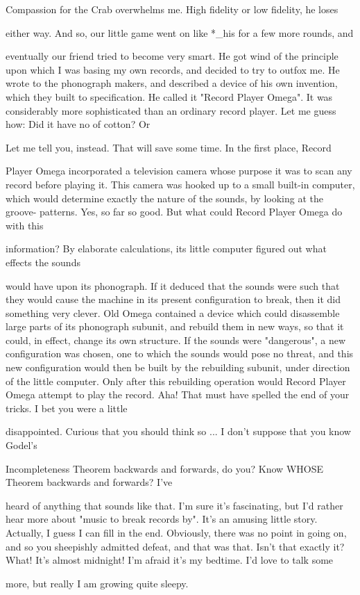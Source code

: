 \achilles Compassion for the Crab overwhelms me. High fidelity or low fidelity, he loses\par
either way. 
\tortoise And so, our little game went on like *_his for a few more rounds, and\par
eventually our friend tried to become very smart. He got wind of the principle upon which I was basing my own records, and decided to try to outfox me. He wrote to the phonograph makers, and described a device of his own invention, which they built to specification. He called it "Record Player Omega". It was considerably more sophisticated than an ordinary record player. 
\achilles Let me guess how: Did it have no of cotton? Or\par

\tortoise Let me tell you, instead. That will save some time. In the first place, Record\par
Player Omega incorporated a television camera whose purpose it was to scan any record before playing it. This camera was hooked up to a small built-in computer, which would determine exactly the nature of the sounds, by looking at the groove- patterns. 
\achilles Yes, so far so good. But what could Record Player Omega do with this\par
information? 
\tortoise By elaborate calculations, its little computer figured out what effects the sounds\par
would have upon its phonograph. If it deduced that the sounds were such that they would cause the machine in its present configuration to break, then it did something very clever. Old Omega contained a device which could disassemble large parts of its phonograph subunit, and rebuild them in new ways, so that it could, in effect, change its own structure. If the sounds were "dangerous", a new configuration was chosen, one to which the sounds would pose no threat, and this new configuration would then be built by the rebuilding subunit, under direction of the little computer. Only after this rebuilding operation would Record Player Omega attempt to play the record. 
\achilles Aha! That must have spelled the end of your tricks. I bet you were a little\par
disappointed. 
\tortoise Curious that you should think so ... I don't suppose that you know Godel's\par
Incompleteness Theorem backwards and forwards, do you? 
\achilles Know WHOSE Theorem backwards and forwards? I've\par
heard of anything that sounds like that. I'm sure it's fascinating, but I'd rather hear more about "music to break records by". It's an amusing little story. Actually, I guess I can fill in the end. Obviously, there was no point in going on, and so you sheepishly admitted defeat, and that was that. Isn't that exactly it? 
\tortoise What! It's almost midnight! I'm afraid it's my bedtime. I'd love to talk some\par
more, but really I am growing quite sleepy. 








